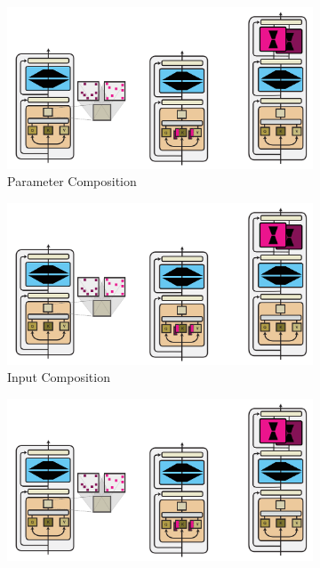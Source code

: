 \documentclass[10pt]{article} %
\begin{document}
\begin{figure}[t]
    \centering
    \begin{subfigure}{.24\linewidth}
    \centering
        \vspace{3em}
        \includegraphics[width=.99\linewidth]{img/Nature_of_modularity_1.pdf}
        \vspace{0.4em}
        \caption{Parameter Composition }
        \label{fig:nature_modularity:parameter_composition}
    \end{subfigure}
    \begin{subfigure}{.24\linewidth}
    \centering
    \vspace{3em}
        \includegraphics[width=.535\linewidth]{img/Nature_of_modularity_2.pdf}  
        \vspace{1.4em}
        \caption{Input Composition}
    \label{fig:nature_modularity:input_composition}
    \end{subfigure}
    \begin{subfigure}{.24\linewidth}
    \centering
        \includegraphics[width=.535\linewidth]{img/Nature_of_modularity_3.pdf}  

\end{subfigure}
\end{figure}
\end{document}
